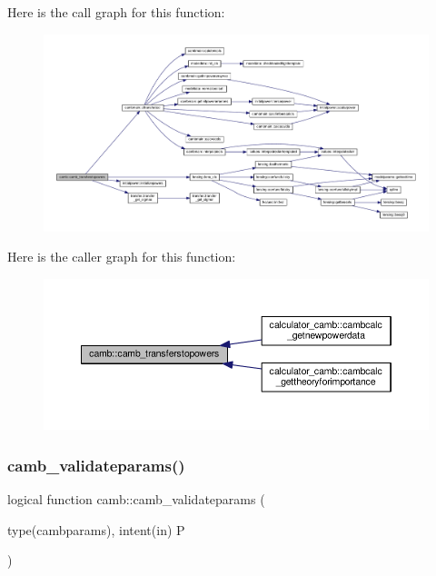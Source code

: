 Here is the call graph for this function\+:
\nopagebreak
\begin{figure}[H]
\begin{center}
\leavevmode
\includegraphics[width=350pt]{namespacecamb_a9fb2095034057d44dc9526dd02d60064_cgraph}
\end{center}
\end{figure}
Here is the caller graph for this function\+:
\nopagebreak
\begin{figure}[H]
\begin{center}
\leavevmode
\includegraphics[width=350pt]{namespacecamb_a9fb2095034057d44dc9526dd02d60064_icgraph}
\end{center}
\end{figure}
\mbox{\label{namespacecamb_ae9577b86a4f0803e5754a23871a7113e}} 
\subsubsection{\texorpdfstring{camb\+\_\+validateparams()}{camb\_validateparams()}}
{\footnotesize\ttfamily logical function camb\+::camb\+\_\+validateparams (\begin{DoxyParamCaption}\item[{type(cambparams), intent(in)}]{P }\end{DoxyParamCaption})}



